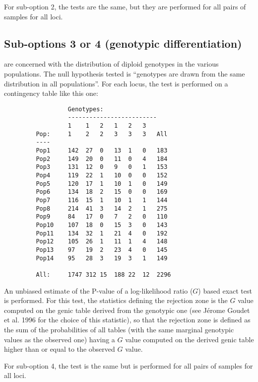 \documentclass[
  12pt,
]{book}
\begin{document}
For sub-option 2, the tests are the same, but they are performed for all pairs of samples for all loci.

\hypertarget{sub-options-3-or-4-genotypic-differentiation}{%
\subsection{Sub-options 3 or 4 (genotypic differentiation)}\label{sub-options-3-or-4-genotypic-differentiation}}

are concerned with the distribution of diploid genotypes in the various populations. The null hypothesis tested is ``genotypes are drawn from the same distribution in all populations''. For each locus, the test is performed on a contingency table like this one:

\begin{verbatim}
                  Genotypes:
                  -------------------------
                  1    1   2   1   2   3
         Pop:     1    2   2   3   3   3   All
         ----
         Pop1     142  27  0   13  1   0   183
         Pop2     149  20  0   11  0   4   184
         Pop3     131  12  0   9   0   1   153
         Pop4     119  22  1   10  0   0   152
         Pop5     120  17  1   10  1   0   149
         Pop6     134  18  2   15  0   0   169
         Pop7     116  15  1   10  1   1   144
         Pop8     214  41  3   14  2   1   275
         Pop9     84   17  0   7   2   0   110
         Pop10    107  18  0   15  3   0   143
         Pop11    134  32  1   21  4   0   192
         Pop12    105  26  1   11  1   4   148
         Pop13    97   19  2   23  4   0   145
         Pop14    95   28  3   19  3   1   149

         All:     1747 312 15  188 22  12  2296
\end{verbatim}

An unbiased estimate of the P-value of a log-likelihood ratio (\(G\)) based exact test is performed. For this test, the statistics defining the rejection zone is the \(G\) value computed on the genic table derived from the genotypic one (see Jérome Goudet et al. 1996 for the choice of this statistic), so that the rejection zone is defined as the sum of the probabilities of all tables (with the same marginal genotypic values as the observed one) having a \(G\) value computed on the derived genic table higher than or equal to the observed \(G\) value.

For sub-option 4, the test is the same but is performed for all pairs of samples for all loci.
\end{document}
